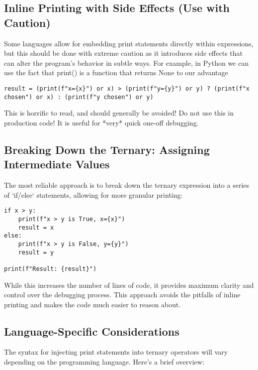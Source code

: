 \documentclass{article}
\begin{document}
{{{{\subsection*{Inline Printing with Side Effects (Use with Caution)}

Some languages allow for embedding print statements directly within expressions, but this should be done with extreme caution as it introduces side effects that can alter the program's behavior in subtle ways.  For example, in Python we can use the fact that print() is a function that returns None to our advantage

\begin{verbatim}
result = (print(f"x={x}") or x) > (print(f"y={y}") or y) ? (print(f"x chosen") or x) : (print(f"y chosen") or y)
\end{verbatim}

This is horrific to read, and should generally be avoided! Do not use this in production code! It is useful for *very* quick one-off debugging.

\subsection*{Breaking Down the Ternary: Assigning Intermediate Values}

The most reliable approach is to break down the ternary expression into a series of `if/else` statements, allowing for more granular printing:

\begin{verbatim}
if x > y:
    print(f"x > y is True, x={x}")
    result = x
else:
    print(f"x > y is False, y={y}")
    result = y

print(f"Result: {result}")
\end{verbatim}

While this increases the number of lines of code, it provides maximum clarity and control over the debugging process.  This approach avoids the pitfalls of inline printing and makes the code much easier to reason about.

\subsection*{Language-Specific Considerations}

The syntax for injecting print statements into ternary operators will vary depending on the programming language. Here's a brief overview:

}}}}
\end{document}
